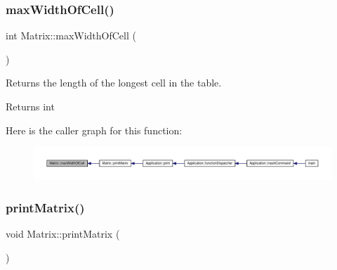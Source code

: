 \subsubsection{\texorpdfstring{max\+Width\+Of\+Cell()}{maxWidthOfCell()}}
{\footnotesize\ttfamily int Matrix\+::max\+Width\+Of\+Cell (\begin{DoxyParamCaption}{ }\end{DoxyParamCaption})\hspace{0.3cm}{\ttfamily [private]}}

Returns the length of the longest cell in the table. \begin{DoxyReturn}{Returns}
int 
\end{DoxyReturn}
Here is the caller graph for this function\+:\nopagebreak
\begin{figure}[H]
\begin{center}
\leavevmode
\includegraphics[width=350pt]{class_matrix_a60dac9b70e73a12d2adb32d6be9ff65d_icgraph}
\end{center}
\end{figure}
\mbox{\label{class_matrix_aa1967ad240a5ffaf492800044b7275d9}} 
\subsubsection{\texorpdfstring{print\+Matrix()}{printMatrix()}}
{\footnotesize\ttfamily void Matrix\+::print\+Matrix (\begin{DoxyParamCaption}{ }\end{DoxyParamCaption})}

